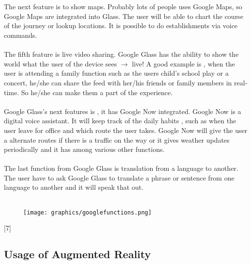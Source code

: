  \\
 \\
 The next feature is to show maps. Probably lots of people uses Google Maps, so Google Maps are integrated into Glass. The user will be able to chart the course of the journey or lookup locations. It is possible to do establishments via voice commands.
 \\
 \\
 The fifth feature is live video sharing. Google Glass has the ability to show the world what the user of the device sees  $\rightarrow$ live! A good example is , when the user is attending a family function such as the users child's school play or a concert, he/she can share the feed with her/his friends or family members in real-time. So he/she can make them a part of the experience.
 \\
 \\
 Google Glass's next features is , it has Google Now integrated. Google Now is a digital voice assistant. It will keep track of the daily habits , such as when the user leave for office and which  route the user takes.  Google Now  will give the user a alternate routes if there is a traffic on the way or it gives weather updates periodically and it has among various other functions.
 \\
 \\
 The last function from  Google Glass is translation from a language to another. The user have to ask Google Glass to translate a phrase or sentence from one language to another and it will speak that out.
 \\
 \\
 \begin{figure}[htbp]
 \centering
 \texttt{[image: graphics/googlefunctions.png]}
 \caption{\cite{glassesPic}}
 \end{figure}
 [7]
 \subsection{Usage of Augmented Reality}
